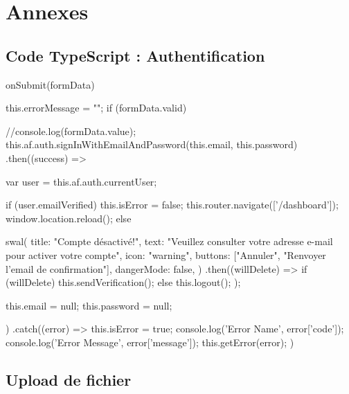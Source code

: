 
\renewcommand{\thesection}{\Alph{section}}

\chapter*{Annexes}

\section{Code TypeScript : Authentification}

\begin{verbatimtab}[3]
	onSubmit(formData) {
		this.errorMessage = "";
		if (formData.valid) {
			//console.log(formData.value);
			this.af.auth.signInWithEmailAndPassword(this.email, this.password)
			.then((success) => {
				var user = this.af.auth.currentUser;
		
				if (user.emailVerified) {
					this.isError = false;
					this.router.navigate(['/dashboard']);
					window.location.reload();
				}
				else {
					swal({
						title: "Compte désactivé!",
						text: "Veuillez consulter votre adresse e-mail pour
						 activer votre compte",
						icon: "warning",
						buttons: ["Annuler", "Renvoyer l'email de confirmation"],
						dangerMode: false,
					})
					.then((willDelete) => {
						if (willDelete) {
							this.sendVerification();
						} else {
						this.logout();
					}
				});
				
				this.email = null;
				this.password = null;
			}
		})
		.catch((error) => {
			this.isError = true;
			console.log('Error Name', error['code']);
			console.log('Error Message', error['message']);
			this.getError(error);
		})
	}
}
\end{verbatimtab}

\section{Upload de fichier}

	
